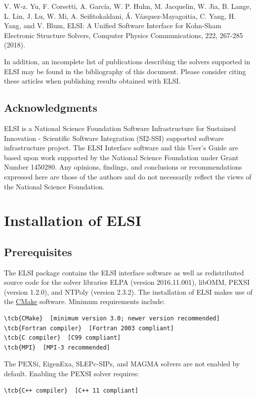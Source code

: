 \documentclass{report}
\newcommand{\tcb}[1]{\textcolor{blue}{#1}}
\begin{document}
V. W-z. Yu, F. Corsetti, A. Garc\'{i}a, W. P. Huhn, M. Jacquelin, W. Jia, B. Lange, L. Lin, J. Lu, W. Mi, A. Seifitokaldani, \'{A}. V\'{a}zquez-Mayagoitia, C. Yang, H. Yang, and V. Blum, ELSI: A Unified Software Interface for Kohn-Sham Electronic Structure Solvers, Computer Physics Communications, 222, 267-285 (2018).

In addition, an incomplete list of publications describing the solvers supported in ELSI may be found in the bibliography of this document. Please consider citing these articles when publishing results obtained with ELSI.

\section{Acknowledgments}
\label{sec:thanks}
ELSI is a National Science Foundation Software Infrastructure for Sustained Innovation - Scientific Software Integration (SI2-SSI) supported software infrastructure project. The ELSI Interface software and this User's Guide are based upon work supported by the National Science Foundation under Grant Number 1450280. Any opinions, findings, and conclusions or recommendations expressed here are those of the authors and do not necessarily reflect the views of the National Science Foundation.

\chapter{Installation of ELSI}
\section{Prerequisites}
\label{sec:prereq}
The ELSI package contains the ELSI interface software as well as redistributed source code for the solver libraries ELPA (version 2016.11.001), libOMM, PEXSI (version 1.2.0), and NTPoly (version 2.3.2). The installation of ELSI makes use of the \href{http://cmake.org}{CMake} software. Minimum requirements include:
\begin{Verbatim}[commandchars=\\\{\}]
\tcb{CMake}  [minimum version 3.0; newer version recommended]
\tcb{Fortran compiler}  [Fortran 2003 compliant]
\tcb{C compiler}  [C99 compliant]
\tcb{MPI}  [MPI-3 recommended]
\end{Verbatim}

The PEXSi, EigenExa, SLEPc-SIPs, and MAGMA solvers are not enabled by default. Enabling the PEXSI solver requires:
\begin{Verbatim}[commandchars=\\\{\}]
\tcb{C++ compiler}  [C++ 11 compliant]
\end{Verbatim}
\end{document}
